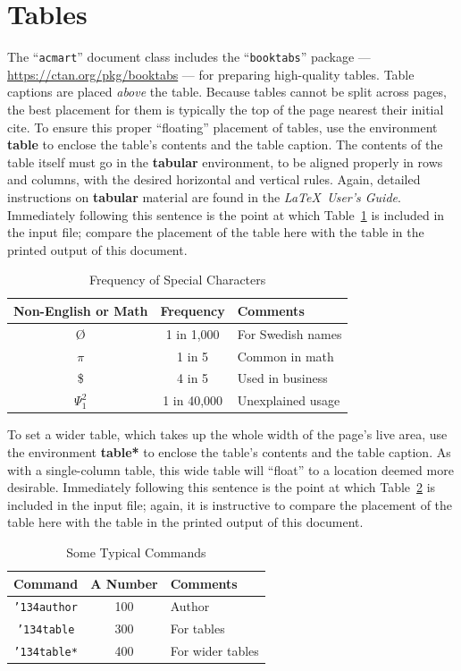 \documentclass[sigplan,screen]{acmart}
\begin{document}
\section{Tables}
The ``\verb|acmart|'' document class includes the ``\verb|booktabs|''
package --- \url{https://ctan.org/pkg/booktabs} --- for preparing
high-quality tables.
Table captions are placed {\itshape above} the table.
Because tables cannot be split across pages, the best placement for
them is typically the top of the page nearest their initial cite.  To
ensure this proper ``floating'' placement of tables, use the
environment \textbf{table} to enclose the table's contents and the
table caption.  The contents of the table itself must go in the
\textbf{tabular} environment, to be aligned properly in rows and
columns, with the desired horizontal and vertical rules.  Again,
detailed instructions on \textbf{tabular} material are found in the
\textit{\LaTeX\ User's Guide}.
Immediately following this sentence is the point at which
Table~\ref{tab:freq} is included in the input file; compare the
placement of the table here with the table in the printed output of
this document.
\begin{table}
	\caption{Frequency of Special Characters}
	\label{tab:freq}
	\begin{tabular}{ccl}
		\toprule
		Non-English or Math & Frequency   & Comments          \\
		\midrule
		\O                  & 1 in 1,000  & For Swedish names \\
		$\pi$               & 1 in 5      & Common in math    \\
		\$                  & 4 in 5      & Used in business  \\
		$\Psi^2_1$          & 1 in 40,000 & Unexplained usage \\
		\bottomrule
	\end{tabular}
\end{table}
To set a wider table, which takes up the whole width of the page's
live area, use the environment \textbf{table*} to enclose the table's
contents and the table caption.  As with a single-column table, this
wide table will ``float'' to a location deemed more
desirable. Immediately following this sentence is the point at which
Table~\ref{tab:commands} is included in the input file; again, it is
instructive to compare the placement of the table here with the table
in the printed output of this document.
\begin{table}
	\caption{Some Typical Commands}
	\label{tab:commands}
	\begin{tabular}{ccl}
		\toprule
		Command                    & A Number & Comments         \\
		\midrule
		\texttt{{\char'134}author} & 100      & Author           \\
		\texttt{{\char'134}table}  & 300      & For tables       \\
		\texttt{{\char'134}table*} & 400      & For wider tables \\
		\bottomrule
	\end{tabular}
\end{table}
\end{document}
